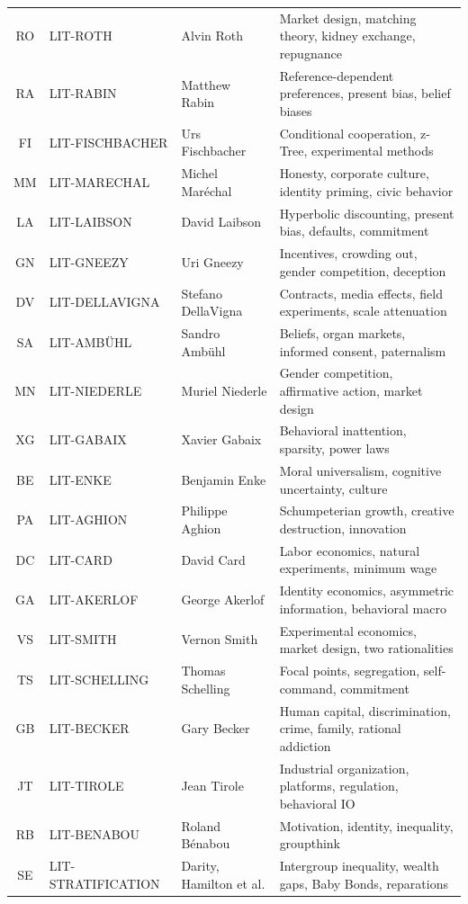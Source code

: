 \begin{table}[htbp]
\begin{tabular}{@{}cllp{5cm}@{}}
RO & LIT-ROTH & Alvin Roth & Market design, matching theory, kidney exchange, repugnance \\
RA & LIT-RABIN & Matthew Rabin & Reference-dependent preferences, present bias, belief biases \\
FI & LIT-FISCHBACHER & Urs Fischbacher & Conditional cooperation, z-Tree, experimental methods \\
MM & LIT-MARECHAL & Michel Maréchal & Honesty, corporate culture, identity priming, civic behavior \\
LA & LIT-LAIBSON & David Laibson & Hyperbolic discounting, present bias, defaults, commitment \\
GN & LIT-GNEEZY & Uri Gneezy & Incentives, crowding out, gender competition, deception \\
DV & LIT-DELLAVIGNA & Stefano DellaVigna & Contracts, media effects, field experiments, scale attenuation \\
SA & LIT-AMBÜHL & Sandro Ambühl & Beliefs, organ markets, informed consent, paternalism \\
MN & LIT-NIEDERLE & Muriel Niederle & Gender competition, affirmative action, market design \\
XG & LIT-GABAIX & Xavier Gabaix & Behavioral inattention, sparsity, power laws \\
BE & LIT-ENKE & Benjamin Enke & Moral universalism, cognitive uncertainty, culture \\
PA & LIT-AGHION & Philippe Aghion & Schumpeterian growth, creative destruction, innovation \\
DC & LIT-CARD & David Card & Labor economics, natural experiments, minimum wage \\
GA & LIT-AKERLOF & George Akerlof & Identity economics, asymmetric information, behavioral macro \\
VS & LIT-SMITH & Vernon Smith & Experimental economics, market design, two rationalities \\
TS & LIT-SCHELLING & Thomas Schelling & Focal points, segregation, self-command, commitment \\
GB & LIT-BECKER & Gary Becker & Human capital, discrimination, crime, family, rational addiction \\
JT & LIT-TIROLE & Jean Tirole & Industrial organization, platforms, regulation, behavioral IO \\
RB & LIT-BENABOU & Roland Bénabou & Motivation, identity, inequality, groupthink \\
SE & LIT-STRATIFICATION & Darity, Hamilton et al. & Intergroup inequality, wealth gaps, Baby Bonds, reparations \\

\end{tabular}
\end{table}
